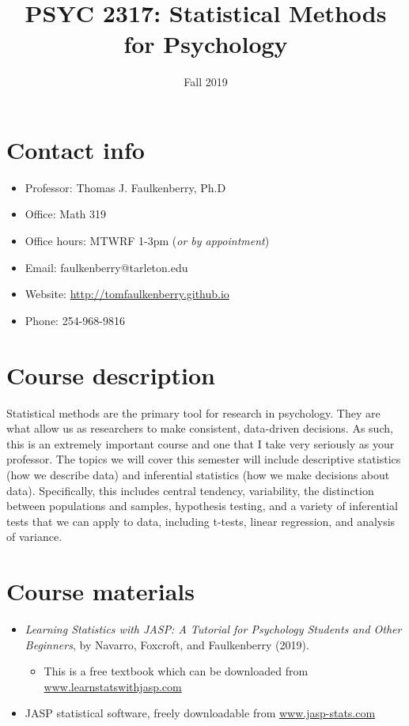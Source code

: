 \documentclass[10pt]{article}
\date{Fall 2019}
\title{PSYC 2317: Statistical Methods for Psychology}
\begin{document}
\maketitle

\section*{Contact info}
\label{sec:org1f1141c}
\begin{itemize}
\item Professor: Thomas J. Faulkenberry, Ph.D
\item Office: Math 319
\item Office hours: MTWRF 1-3pm (\emph{or by appointment})
\item Email: faulkenberry@tarleton.edu
\item Website: \url{http://tomfaulkenberry.github.io}
\item Phone: 254-968-9816
\end{itemize}

\section*{Course description}
\label{sec:orgd2de8e3}

Statistical methods are the primary tool for research in psychology. They are what allow us as researchers to make consistent, data-driven decisions.  As such, this is an extremely important course and one that I take very seriously as your professor. The topics we will cover this semester will include descriptive statistics (how we describe data) and inferential statistics (how we make decisions about data).  Specifically, this includes central tendency, variability, the distinction between populations and samples, hypothesis testing, and a variety of inferential tests that we can apply to data, including t-tests, linear regression, and analysis of variance.

\section*{Course materials}
\label{sec:org3145b94}
\begin{itemize}
\item \emph{Learning Statistics with JASP: A Tutorial for Psychology Students and Other Beginners}, by Navarro, Foxcroft, and Faulkenberry (2019). 
\begin{itemize}
\item This is a free textbook which can be downloaded from \href{http://learnstatswithjasp.com}{www.learnstatswithjasp.com}
\end{itemize}
\item JASP statistical software, freely downloadable from \href{http://www.jasp-stats.com}{www.jasp-stats.com}
\end{itemize}
\end{document}

